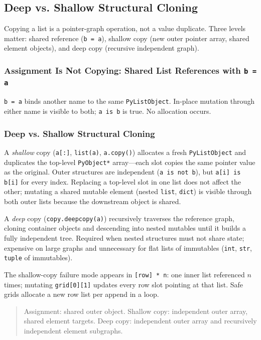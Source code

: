 \documentclass[a4paper,twoside]{report}
\begin{document}
\subsection{Deep vs. Shallow Structural Cloning}

Copying a list is a pointer-graph operation, not a value duplicate. Three levels matter: shared reference (\texttt{b = a}), shallow copy (new outer pointer array, shared element objects), and deep copy (recursive independent graph).

\subsubsection{Assignment Is Not Copying: Shared List References with \texttt{b = a}}

\texttt{b = a} binds another name to the same \texttt{PyListObject}. In-place mutation through either name is visible to both; \texttt{a is b} is true. No allocation occurs.

\subsubsection{Deep vs. Shallow Structural Cloning}

A \emph{shallow} copy (\texttt{a[:]}, \texttt{list(a)}, \texttt{a.copy()}) allocates a fresh \texttt{PyListObject} and duplicates the top-level \texttt{PyObject*} array---each slot copies the same pointer value as the original. Outer structures are independent (\texttt{a is not b}), but \texttt{a[i] is b[i]} for every index. Replacing a top-level slot in one list does not affect the other; mutating a shared mutable element (nested \texttt{list}, \texttt{dict}) is visible through both outer lists because the downstream object is shared.

A \emph{deep} copy (\texttt{copy.deepcopy(a)}) recursively traverses the reference graph, cloning container objects and descending into nested mutables until it builds a fully independent tree. Required when nested structures must not share state; expensive on large graphs and unnecessary for flat lists of immutables (\texttt{int}, \texttt{str}, \texttt{tuple} of immutables).

The shallow-copy failure mode appears in \texttt{[row] * n}: one inner list referenced $n$ times; mutating \texttt{grid[0][1]} updates every row slot pointing at that list. Safe grids allocate a new row list per append in a loop.

\begin{quote}
Assignment: shared outer object. Shallow copy: independent outer array, shared element targets. Deep copy: independent outer array and recursively independent element subgraphs.
\end{quote}
\end{document}
